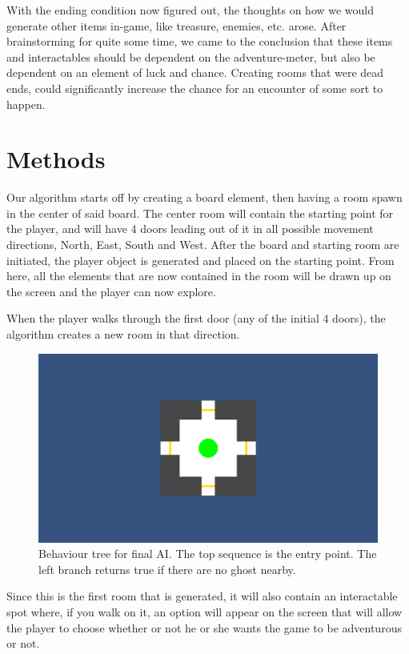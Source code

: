 \documentclass[conference,compsoc]{IEEEtran}
\begin{document}
With the ending condition now figured out, the thoughts on how we would generate other items in-game, like treasure, enemies, etc. arose. After brainstorming for quite some time, we came to the conclusion that these items and interactables should be dependent on the adventure-meter, but also be dependent on an element of luck and chance.
Creating rooms that were dead ends, could significantly increase the chance for an encounter of some sort to happen.

\section{Methods}
Our algorithm starts off by creating a board element, then having a room spawn in the center of said board. The center room will contain the starting point for the player, and will have 4 doors leading out of it in all possible movement directions, North, East, South and West.
After the board and starting room are initiated, the player object is generated and placed on the starting point. From here, all the elements that are now contained in the room will be drawn up on the screen and the player can now explore.

When the player walks through the first door (any of the initial 4 doors), the algorithm creates a new room in that direction. 
\begin{figure}[h]
	\graphicspath{{figures/}}
	\includegraphics[width = \columnwidth ]{StartLayout.png}
	\caption{Behaviour tree for final AI. The top sequence is the entry point. The left branch returns true if there are no ghost nearby.}
	\label{fig:behavTree}
\end{figure}
Since this is the first room that is generated, it will also contain an interactable spot where, if you walk on it, an option will appear on the screen that will allow the player to choose whether or not he or she wants the game to be adventurous or not.
\end{document}
